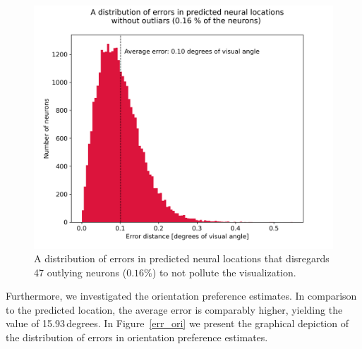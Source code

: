 \begin{figure}[H]\centering
	\includegraphics[width=150mm]{../img/distribution_of_distances_errors.png}
	\caption{A distribution of errors in predicted neural locations that disregards 47 outlying neurons ($0.16 \%$) to not pollute the visualization.}
	\label{err_dist}
\end{figure}


Furthermore, we investigated the orientation preference estimates. In comparison to the predicted location, the average error is comparably higher, yielding the value of 15.93\,degrees. In Figure~\ref{err_ori} we present the graphical depiction of the distribution of errors in orientation preference estimates.

